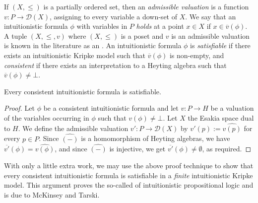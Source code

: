 If $(X, \leq)$ is a partially ordered set, then an \emph{admissible valuation} is a function $v \colon P \to \mathcal{D}(X)$, assigning to every variable a down-set of $X$. We say that an intuitionistic formula $\phi$ with variables in $P$ \emph{holds} at a point $x \in X$ if $x \in \overline{v}(\phi)$. A tuple $(X, \leq, v)$ where $(X,\leq)$ is a poset and $v$ is an admissible valuation is known in the literature as an . An intuitionistic formula $\phi$ is \emph{satisfiable} if there exists an intuitionistic Kripke model such that $\overline{v}(\phi)$ is non-empty, and \emph{consistent} if there exists an interpretation to a Heyting algebra such that $\overline{v}(\phi) \neq \bot$.

\begin{theorem}\label{thm:int-completeness}
  Every consistent intuitionistic formula is satisfiable.
\end{theorem}
\begin{proof}
 Let $\phi$ be a consistent intuitionistic formula and let $v \colon P \to H$ be a valuation of the variables occurring in $\phi$ such that $v(\phi) \neq \bot$. Let $X$ the Esakia space dual to $H$. We define the admissible valuation $v' \colon P \to \mathcal{D}(X)$ by $v'(p) := \widehat{v(p)}$ for every $p \in P$. Since $\widehat{(-)}$ is a homomorphism of Heyting algebras, we have $\overline{v'}(\phi) = \widehat{v(\phi)}$, and since $\widehat{(-)}$ is injective, we get $\overline{v'}(\phi) \neq \emptyset$, as required.
\end{proof}

With only a little extra work, we may use the above proof technique to show that every consistent intuitionistic formula is satisfiable in a \emph{finite} intuitionistic Kripke model. This argument proves the so-called  of intuitionistic propositional logic and is due to McKinsey and Tarski.

